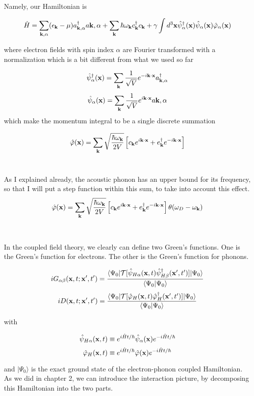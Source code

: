 Namely, our Hamiltonian is

\[\hat{H} = \sum_{\bf k,\alpha}(\epsilon_{\bf k}-\mu)a^\dagger_{\bf k,\alpha}a{\bf k,\alpha} + \sum_{\bf k}\hbar\omega_{\bf k}c_{\bf k}^\dagger c_{\bf k} + \gamma\int d^3{\bf x}\hat\psi_\alpha^\dagger({\bf x})\hat\psi_\alpha({\bf x})\hat\varphi_\alpha({\bf x}) \]

where electron fields with spin index $\alpha$ are Fourier transformed with a normalization which is a bit different from what we used so far

\[\hat\psi_\alpha^\dagger({\bf x}) = \sum_{\bf k}\frac{1}{\sqrt{V}}e^{-i\bf k\cdot x}a^\dagger_{\bf k,\alpha} \]
\[\hat\psi_\alpha({\bf x}) = \sum_{\bf k}\frac{1}{\sqrt{V}}e^{i\bf k\cdot x}a{\bf k,\alpha} \]
which make the momentum integral to be a single discrete summation

\[\hat\varphi({\bf x})=\sum_{\bf k}\sqrt{\frac{\hbar\omega_{\bf k}}{2V}}\left[c_{\bf k}e^{i\bf k\cdot x}+e_{\bf k}^\dagger e^{-i\bf k\cdot x}\right] \]
\dotfill
\

As I explained already, the acoustic phonon has an upper bound for its frequency, so that I will put a step function within this sum, to take into account this effect.
\[\hat\varphi({\bf x})=\sum_{\bf k}\sqrt{\frac{\hbar\omega_{\bf k}}{2V}}\left[c_{\bf k}e^{i\bf k\cdot x}+e_{\bf k}^\dagger e^{-i\bf k\cdot x}\right] \theta(\omega_D-\omega_{\bf k}) \]
\dotfill

\

In the coupled field theory, we clearly can define two Green's functions. One is the Green's function for electrons. The other is the Green's function for phonons.

\[iG_{\alpha\beta}({\bf x},t;{\bf x'},t') = \frac{\langle\Psi_0|\mathcal{T}[\hat\psi_{H\alpha}({\bf x},t)\hat\psi_{H\beta}^\dagger({\bf x'},t')]|\Psi_0\rangle}{\langle\Psi_0|\Psi_0\rangle} \]
\[iD({\bf x},t;{\bf x'},t') = \frac{\langle\Psi_0|\mathcal{T}[\hat\varphi_{H}({\bf x},t)\hat\varphi_{H}^\dagger({\bf x'},t')]|\Psi_0\rangle}{\langle\Psi_0|\Psi_0\rangle}  \]

with 

\[\hat\psi_{H\alpha}({\bf x},t) \equiv e^{i\hat Ht/\hbar}\hat\psi_\alpha({\bf x})e^{-i\hat Ht/\hbar} \]
\[\hat\varphi_{H}({\bf x},t) \equiv e^{i\hat Ht/\hbar}\hat\varphi({\bf x})e^{-i\hat Ht/\hbar} \]

and $|\Psi_0\rangle$ is the exact ground state of the electron-phonon coupled Hamiltonian. As we did in chapter 2, we can introduce the interaction picture, by decomposing this Hamiltonian into the two parts. 

